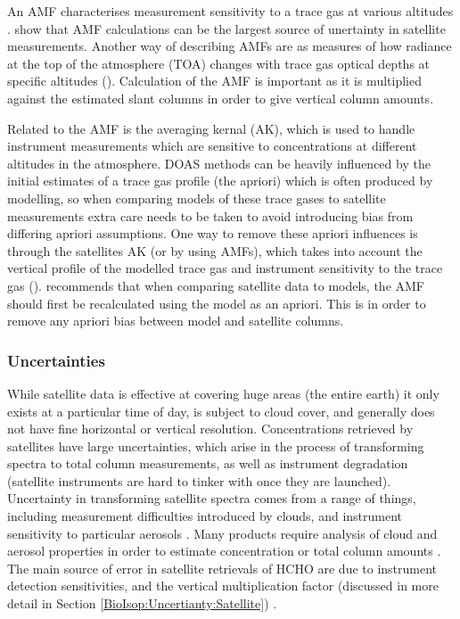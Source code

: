     An AMF characterises measurement sensitivity to a trace gas at various altitudes \cite[e.g.]{Palmer2001}.
    \cite{Lorente2017} show that AMF calculations can be the largest source of unertainty in satellite measurements.
    Another way of describing AMFs are as measures of how radiance at the top of the atmosphere (TOA) changes with trace gas optical depths at specific altitudes (\cite{Lorente2017}).
    Calculation of the AMF is important as it is multiplied against the estimated slant columns in order to give vertical column amounts.
    
    Related to the AMF is the averaging kernal (AK), which is used to handle instrument measurements which are sensitive to concentrations at different altitudes in the atmosphere.
    DOAS methods can be heavily influenced by the initial estimates of a trace gas profile (the apriori) which is often produced by modelling, so when comparing models of these trace gases to satellite measurements extra care needs to be taken to avoid introducing bias from differing apriori assumptions.
    One way to remove these apriori influences is through the satellites AK (or by using AMFs), which takes into account the vertical profile of the modelled trace gas and instrument sensitivity to the trace gas (\cite{Eskes2003, Palmer2001}).
    \cite{Lamsal2014} recommends that when comparing satellite data to models, the AMF should first be recalculated using the model as an apriori.
    This is in order to remove any apriori bias between model and satellite columns.
    
    \subsubsection{Uncertainties}
    While satellite data is effective at covering huge areas (the entire earth) it only exists at a particular time of day, is subject to cloud cover, and generally does not have fine horizontal or vertical resolution.
    Concentrations retrieved by satellites have large uncertainties, which arise in the process of transforming spectra to total column measurements, as well as instrument degradation (satellite instruments are hard to tinker with once they are launched).
    Uncertainty in transforming satellite spectra comes from a range of things, including measurement difficulties introduced by clouds, and instrument sensitivity to particular aerosols \citep{Millet2006}.
    Many products require analysis of cloud and aerosol properties in order to estimate concentration or total column amounts \citep{Palmer2001,Palmer2003, Marais2012, Vasilkov2017}.
    The main source of error in satellite retrievals of HCHO are due to instrument detection sensitivities, and the vertical multiplication factor (discussed in more detail in Section \ref{BioIsop:Uncertianty:Satellite}) \citep{Millet2006}.
    
